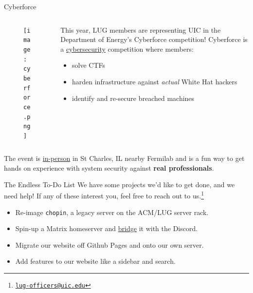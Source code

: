 \documentclass{beamer}
\begin{document}
\begin{frame}{Cyberforce}
	\begin{columns}
		\begin{column}{0.4\textwidth}
			\begin{figure}
				\centering
				\texttt{[image: cyberforce.png]}
			\end{figure}
		\end{column}
		\begin{column}{0.6\textwidth}
			This year, LUG members are representing UIC in the
			Department of Energy's Cyberforce competition!
			\pause
			Cyberforce is a \underline{cybersecurity} competition
			where members:
			\begin{itemize}
				\item solve CTFs
					\pause
				\item harden infrastructure against
					\textit{actual} White Hat hackers
					\pause
				\item identify and re-secure breached machines
					\pause
			\end{itemize}
		\end{column}
	\end{columns}

	\vspace{0.3cm}

	The event is \underline{in-person} in St Charles, IL nearby Fermilab
	and is a fun way to get hands on experience with system security
	against \textbf{real professionals}.
\end{frame}

\begin{frame}{The Endless To-Do List}
	We have some projects we'd like to get done, and we need help! If any
	of these interest you, feel free to reach out to us.\footnote{
		\href{mailto:lug-officers@uic.edu}{\texttt{lug-officers@uic.edu}}}
	\pause

	\begin{itemize}
		\item Re-image \texttt{chopin}, a legacy server on the ACM/LUG
			server rack.
		\item Spin-up a Matrix homeserver and \underline{bridge} it
			with the Discord.
		\item Migrate our website off Github Pages and onto our own
			server.
		\item Add features to our website like a sidebar and search.
	\end{itemize}
\end{frame}
\end{document}
